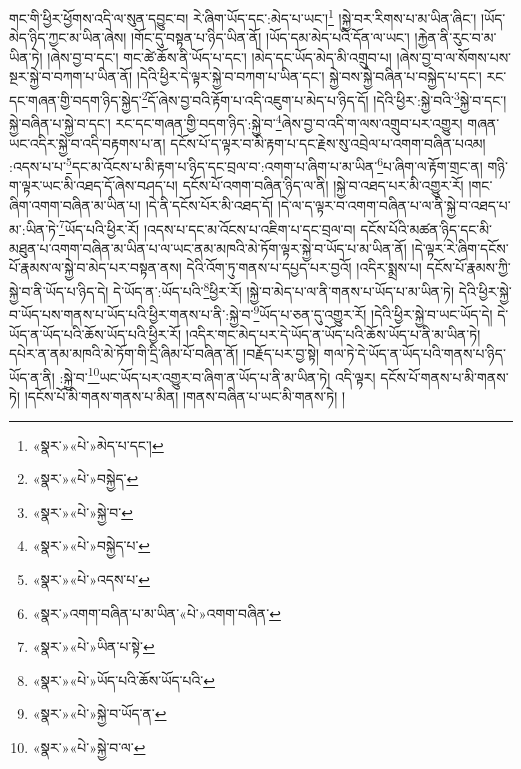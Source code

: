 གང་གི་ཕྱིར་ཕྱོགས་འདི་ལ་སུན་དབྱུང་བ། རེ་ཞིག་ཡོད་དང་:མེད་པ་ཡང་།\footnote{«སྣར་»«པེ་»མེད་པ་དང་།} །སྐྱེ་བར་རིགས་པ་མ་ཡིན་ཞིང་། །ཡོད་མེད་ཉིད་ཀྱང་མ་ཡིན་ཞེས། །གོང་དུ་བསྟན་པ་ཉིད་ཡིན་ནོ། །ཡོད་དམ་མེད་པའི་དོན་ལ་ཡང་། །རྐྱེན་ནི་རུང་བ་མ་ཡིན་ཏེ། །ཞེས་བྱ་བ་དང་། གང་ཚེ་ཆོས་ནི་ཡོད་པ་དང་། །མེད་དང་ཡོད་མེད་མི་འགྲུབ་པ། །ཞེས་བྱ་བ་ལ་སོགས་པས་སྔར་སྐྱེ་བ་བཀག་པ་ཡིན་ནོ། །དེའི་ཕྱིར་དེ་ལྟར་སྐྱེ་བ་བཀག་པ་ཡིན་དང་། སྐྱེ་བས་སྐྱེ་བཞིན་པ་བསྐྱེད་པ་དང་། རང་དང་གཞན་གྱི་བདག་ཉིད་སྐྱེད་\footnote{«སྣར་»«པེ་»བསྐྱེད་}དོ་ཞེས་བྱ་བའི་རྟོག་པ་འདི་འཇུག་པ་མེད་པ་ཉིད་དོ། །དེའི་ཕྱིར་:སྐྱེ་བའི་\footnote{«སྣར་»«པེ་»སྐྱེ་བ་}སྐྱེ་བ་དང་། སྐྱེ་བཞིན་པ་སྐྱེ་བ་དང་། རང་དང་གཞན་གྱི་བདག་ཉིད་:སྐྱེ་བ་\footnote{«སྣར་»«པེ་»བསྐྱེད་པ་}ཞེས་བྱ་བ་འདི་ག་ལས་འགྲུབ་པར་འགྱུར། གཞན་ཡང་འདིར་སྐྱེ་བ་འདི་བརྟགས་པ་ན། དངོས་པོ་ད་ལྟར་བ་མི་རྟག་པ་དང་རྗེས་སུ་འབྲེལ་པ་འགག་བཞིན་པའམ། :འདས་པ་པ་\footnote{«སྣར་»«པེ་»འདས་པ་}དང་མ་འོངས་པ་མི་རྟག་པ་ཉིད་དང་བྲལ་བ་:འགག་པ་ཞིག་པ་མ་ཡིན་\footnote{«སྣར་»འགག་བཞིན་པ་མ་ཡིན་«པེ་»འགག་བཞིན་}པ་ཞིག་ལ་རྟོག་གྲང་ན། གཉི་ག་ལྟར་ཡང་མི་འཐད་དོ་ཞེས་བཤད་པ། དངོས་པོ་འགག་བཞིན་ཉིད་ལ་ནི། །སྐྱེ་བ་འཐད་པར་མི་འགྱུར་རོ། །གང་ཞིག་འགག་བཞིན་མ་ཡིན་པ། །དེ་ནི་དངོས་པོར་མི་འཐད་དོ། །དེ་ལ་ད་ལྟར་བ་འགག་བཞིན་པ་ལ་ནི་སྐྱེ་བ་འཐད་པ་མ་:ཡིན་ཏེ་\footnote{«སྣར་»«པེ་»ཡིན་པ་སྟེ་}ཡོད་པའི་ཕྱིར་རོ། །འདས་པ་དང་མ་འོངས་པ་འཇིག་པ་དང་བྲལ་བ། དངོས་པོའི་མཚན་ཉིད་དང་མི་མཐུན་པ་འགག་བཞིན་མ་ཡིན་པ་ལ་ཡང་ནམ་མཁའི་མེ་ཏོག་ལྟར་སྐྱེ་བ་ཡོད་པ་མ་ཡིན་ནོ། །དེ་ལྟར་རེ་ཞིག་དངོས་པོ་རྣམས་ལ་སྐྱེ་བ་མེད་པར་བསྟན་ནས། དེའི་འོག་ཏུ་གནས་པ་དཔྱད་པར་བྱའོ། །འདིར་སྨྲས་པ། དངོས་པོ་རྣམས་ཀྱི་སྐྱེ་བ་ནི་ཡོད་པ་ཉིད་དེ། དེ་ཡོད་ན་:ཡོད་པའི་\footnote{«སྣར་»«པེ་»ཡོད་པའི་ཆོས་ཡོད་པའི་}ཕྱིར་རོ། །སྐྱེ་བ་མེད་པ་ལ་ནི་གནས་པ་ཡོད་པ་མ་ཡིན་ཏེ། དེའི་ཕྱིར་སྐྱེ་བ་ཡོད་པས་གནས་པ་ཡོད་པའི་ཕྱིར་གནས་པ་ནི་:སྐྱེ་བ་\footnote{«སྣར་»«པེ་»སྐྱེ་བ་ཡོད་ན་}ཡོད་པ་ཅན་དུ་འགྱུར་རོ། །དེའི་ཕྱིར་སྐྱེ་བ་ཡང་ཡོད་དེ། དེ་ཡོད་ན་ཡོད་པའི་ཆོས་ཡོད་པའི་ཕྱིར་རོ། །འདིར་གང་མེད་པར་དེ་ཡོད་ན་ཡོད་པའི་ཆོས་ཡོད་པ་ནི་མ་ཡིན་ཏེ། དཔེར་ན་ནམ་མཁའི་མེ་ཏོག་གི་དྲི་ཞིམ་པོ་བཞིན་ནོ། །བརྗོད་པར་བྱ་སྟེ། གལ་ཏེ་དེ་ཡོད་ན་ཡོད་པའི་གནས་པ་ཉིད་ཡོད་ན་ནི། :སྐྱེ་བ་\footnote{«སྣར་»«པེ་»སྐྱེ་བ་ལ་}ཡང་ཡོད་པར་འགྱུར་བ་ཞིག་ན་ཡོད་པ་ནི་མ་ཡིན་ཏེ། འདི་ལྟར། དངོས་པོ་གནས་པ་མི་གནས་ཏེ། །དངོས་པོ་མི་གནས་གནས་པ་མིན། །གནས་བཞིན་པ་ཡང་མི་གནས་ཏེ། །
